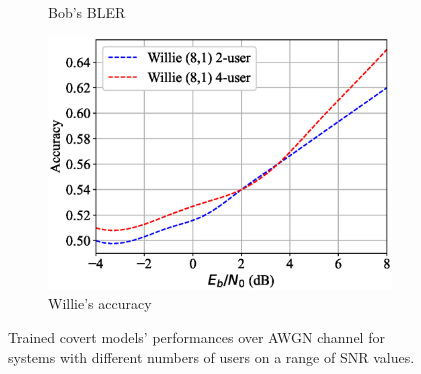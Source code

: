 \begin{figure}[tp!]
\begin{subfigure}{0.28\textwidth}
		\caption{Bob's BLER}	
		\label{fig:multi_awgn_results_bob}
	\end{subfigure}
	\hspace*{\fill}
	\begin{subfigure}{0.28\textwidth}
		\includegraphics[width=\linewidth]{figs/multi_willie_accuracy_awgn}
		\caption{Willie's accuracy}	
		\label{fig:multi_awgn_results_willie}
	\end{subfigure}
	\caption{Trained covert models' performances over AWGN channel for systems with different numbers of users on a range of SNR values.}
	\label{fig:multi_awgn_results}
\end{figure}
